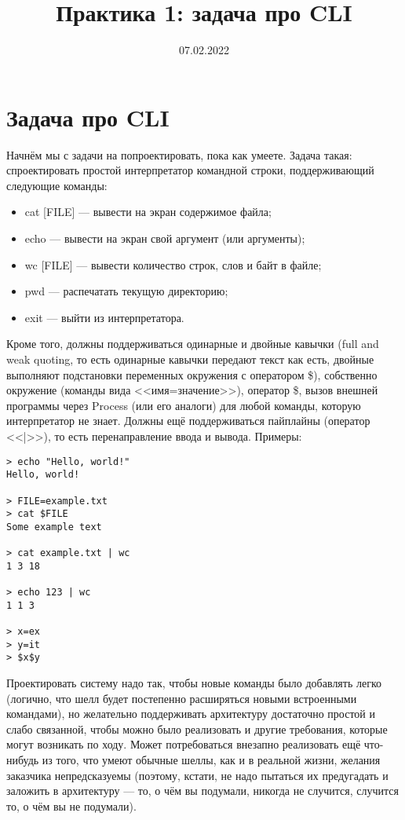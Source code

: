 \documentclass[a5paper]{article}
\title{Практика 1: задача про CLI}
\date{07.02.2022}
\begin{document}
\maketitle
\thispagestyle{empty}

\section{Задача про CLI}

Начнём мы с задачи на попроектировать, пока как умеете. Задача такая: спроектировать простой интерпретатор командной строки, поддерживающий следующие команды:

\begin{itemize}
    \item cat [FILE] --- вывести на экран содержимое файла;
    \item echo --- вывести на экран свой аргумент (или аргументы);
    \item wc [FILE] --- вывести количество строк, слов и байт в файле;
    \item pwd --- распечатать текущую директорию;
    \item exit --- выйти из интерпретатора.
\end{itemize}

Кроме того, должны поддерживаться одинарные и двойные кавычки (full and weak quoting, то есть одинарные кавычки передают текст как есть, двойные выполняют подстановки переменных окружения с оператором \$), собственно окружение (команды вида <<имя=значение>>), оператор \$, вызов внешней программы через Process (или его аналоги) для любой команды, которую интерпретатор не знает. Должны ещё поддерживаться пайплайны (оператор <<|>>), то есть перенаправление ввода и вывода. Примеры:

\begin{verbatim}
> echo "Hello, world!"
Hello, world!

> FILE=example.txt
> cat $FILE
Some example text

> cat example.txt | wc
1 3 18

> echo 123 | wc
1 1 3

> x=ex
> y=it
> $x$y
\end{verbatim}

Проектировать систему надо так, чтобы новые команды было добавлять легко (логично, что шелл будет постепенно расширяться новыми встроенными командами), но желательно поддерживать архитектуру достаточно простой и слабо связанной, чтобы можно было реализовать и другие требования, которые могут возникать по ходу. Может потребоваться внезапно реализовать ещё что-нибудь из того, что умеют обычные шеллы, как и в реальной жизни, желания заказчика непредсказуемы (поэтому, кстати, не надо пытаться их предугадать и заложить в архитектуру --- то, о чём вы подумали, никогда не случится, случится то, о чём вы не подумали).
\end{document}
